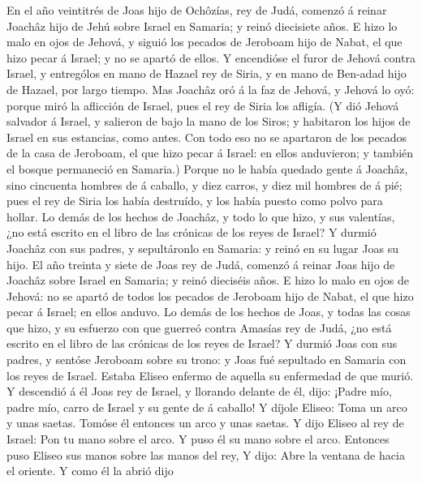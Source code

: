  En el año veintitrés de Joas hijo de Ochôzías, rey de Judá,
comenzó á reinar Joachâz hijo de Jehú sobre Israel en Samaria; y reinó
diecisiete años.  E hizo lo malo en ojos de Jehová, y siguió
los pecados de Jeroboam hijo de Nabat, el que hizo pecar á Israel; y no
se apartó de ellos.  Y encendióse el furor de Jehová contra
Israel, y entrególos en mano de Hazael rey de Siria, y en mano de
Ben-adad hijo de Hazael, por largo tiempo.  Mas Joachâz oró
á la faz de Jehová, y Jehová lo oyó: porque miró la aflicción de Israel,
pues el rey de Siria los afligía.  (Y dió Jehová salvador á
Israel, y salieron de bajo la mano de los Siros; y habitaron los hijos
de Israel en sus estancias, como antes.  Con todo eso no se
apartaron de los pecados de la casa de Jeroboam, el que hizo pecar á
Israel: en ellos anduvieron; y también el bosque permaneció en Samaria.)
 Porque no le había quedado gente á Joachâz, sino cincuenta
hombres de á caballo, y diez carros, y diez mil hombres de á pié; pues
el rey de Siria los había destruído, y los había puesto como polvo para
hollar.  Lo demás de los hechos de Joachâz, y todo lo que
hizo, y sus valentías, ¿no está escrito en el libro de las crónicas de
los reyes de Israel?  Y durmió Joachâz con sus padres, y
sepultáronlo en Samaria: y reinó en su lugar Joas su hijo. 
El año treinta y siete de Joas rey de Judá, comenzó á reinar Joas hijo
de Joachâz sobre Israel en Samaria; y reinó dieciséis años.
 E hizo lo malo en ojos de Jehová: no se apartó de todos
los pecados de Jeroboam hijo de Nabat, el que hizo pecar á Israel; en
ellos anduvo.  Lo demás de los hechos de Joas, y todas las
cosas que hizo, y su esfuerzo con que guerreó contra Amasías rey de
Judá, ¿no está escrito en el libro de las crónicas de los reyes de
Israel?  Y durmió Joas con sus padres, y sentóse Jeroboam
sobre su trono: y Joas fué sepultado en Samaria con los reyes de Israel.
 Estaba Eliseo enfermo de aquella su enfermedad de que
murió. Y descendió á él Joas rey de Israel, y llorando delante de él,
dijo: ¡Padre mío, padre mío, carro de Israel y su gente de á caballo!
 Y díjole Eliseo: Toma un arco y unas saetas. Tomóse él
entonces un arco y unas saetas.  Y dijo Eliseo al rey de
Israel: Pon tu mano sobre el arco. Y puso él su mano sobre el arco.
Entonces puso Eliseo sus manos sobre las manos del rey,  Y
dijo: Abre la ventana de hacia el oriente. Y como él la abrió dijo

